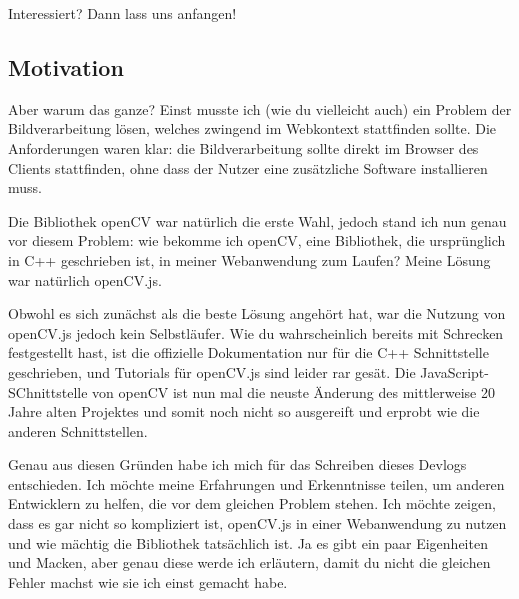 Interessiert? Dann lass uns anfangen!

\subsection{Motivation}
Aber warum das ganze? Einst musste ich (wie du vielleicht auch) ein Problem der Bildverarbeitung lösen, welches zwingend im Webkontext stattfinden sollte. Die Anforderungen waren klar: die Bildverarbeitung sollte direkt im Browser des Clients stattfinden, ohne dass der Nutzer eine zusätzliche Software installieren muss. 

Die Bibliothek openCV war natürlich die erste Wahl, jedoch stand ich nun genau vor diesem Problem: wie bekomme ich openCV, eine Bibliothek, die ursprünglich in C++ geschrieben ist, in meiner Webanwendung zum Laufen? Meine Lösung war natürlich openCV.js.

Obwohl es sich zunächst als die beste Lösung angehört hat, war die Nutzung von openCV.js jedoch kein Selbstläufer. Wie du wahrscheinlich bereits mit Schrecken festgestellt hast, ist die offizielle Dokumentation nur für die C++ Schnittstelle geschrieben, und Tutorials für openCV.js sind leider rar gesät. Die JavaScript-SChnittstelle von openCV ist nun mal die neuste Änderung des mittlerweise 20 Jahre alten Projektes und somit noch nicht so ausgereift und erprobt wie die anderen Schnittstellen.

Genau aus diesen Gründen habe ich mich für das Schreiben dieses Devlogs entschieden. Ich möchte meine Erfahrungen und Erkenntnisse teilen, um anderen Entwicklern zu helfen, die vor dem gleichen Problem stehen. Ich möchte zeigen, dass es gar nicht so kompliziert ist, openCV.js in einer Webanwendung zu nutzen und wie mächtig die Bibliothek tatsächlich ist. Ja es gibt ein paar Eigenheiten und Macken, aber genau diese werde ich erläutern, damit du nicht die gleichen Fehler machst wie sie ich einst gemacht habe.